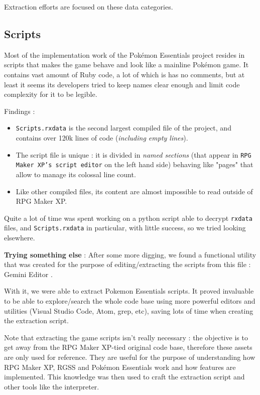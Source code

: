 \documentclass[11pt]{article}
\begin{document}
{Extraction efforts are focused on these data categories.


\subsection{Scripts}

Most of the implementation work of the Pokémon Essentials project resides in scripts that makes the game behave and look like a mainline Pokémon game. It contains vast amount of Ruby code, a lot of which is has no comments, but at least it seems its developers tried to keep names clear enough and limit code complexity for it to be legible.

Findings :
\begin{itemize}
	\item \verb|Scripts.rxdata| is the second largest compiled file of the project, and contains over 120k lines of code (\textit{including empty lines}).
	
	\item The script file is unique : it is divided in \textit{named sections} (that appear in \texttt{RPG Maker XP's script editor} on the left hand side) behaving like "pages" that allow to manage its colossal line count.
	
	\item Like other compiled files, its content are almost impossible to read outside of RPG Maker XP.
\end{itemize}

Quite a lot of time was spent working on a python script able to decrypt \verb|rxdata| files, and \verb|Scripts.rxdata| in particular, with little success, so we tried looking elsewhere.

\textbf{Trying something else} : After some more digging, we found a functional utility that was created for the purpose of editing/extracting the scripts from this file : Gemini Editor \cite{GEgithub, GEforum}.

With it, we were able to extract Pokemon Essentials scripts. It proved invaluable to be able to explore/search the whole code base using more powerful editors and utilities (Visual Studio Code, Atom, grep, etc), saving lots of time when creating the extraction script.

Note that extracting the game scripts isn't really necessary : the objective is to get away from the RPG Maker XP-tied original code base, therefore these assets are only used for reference. They are useful for the purpose of understanding how RPG Maker XP, RGSS and Pokémon Essentials work and how features are implemented. This knowledge was then used to craft the extraction script and other tools like the interpreter.



}
\end{document}
